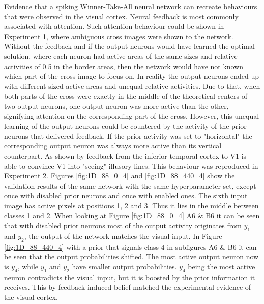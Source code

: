 Evidence that a spiking Winner-Take-All neural network can recreate behaviours that were observed in the visual cortex. Neural feedback is most commonly associated with attention. Such attention behaviour could be shown in Experiment 1, where ambiguous cross images were shown to the network. Without the feedback and if the output neurons would have learned the optimal solution, where each neuron had active areas of the same sizes and relative activities of 0.5 in the border areas, then the network would have not known which part of the cross image to focus on. In reality the output neurons ended up with different sized active areas and unequal relative activities. Due to that, when both parts of the cross were exactly in the middle of the theoretical centers of two output neurons, one output neuron was more active than the other, signifying attention on the corresponding part of the cross. However, this unequal learning of the output neurons could be countered by the activity of the prior neurons that delivered feedback. If the prior activity was set to "horizontal" the corresponding output neuron was always more active than its vertical counterpart. As shown by \citet{HierachicalBayesVisualCortex} feedback from the inferior temporal cortex to V1 is able to convince V1 into "seeing" illusory lines. This behaviour was reproduced in Experiment 2. Figures \ref{fig:1D_88_0_4} and \ref{fig:1D_88_440_4} show the validation results of the same network with the same hyperparameter set, except once with disabled prior neurons and once with enabled ones. The sixth input image has active pixels at positions 1, 2 and 3. Thus it lies in the middle between classes 1 and 2. When looking at Figure \ref{fig:1D_88_0_4} A6 & B6 it can be seen that with disabled prior neurons most of the output activity originates from $y_1$ and $y_2$, the output of the network  matches the visual input. In Figure \ref{fig:1D_88_440_4} with a prior that signals class 4 in subfigures A6 & B6 it can be seen that the output probabilities shifted. The most active output neuron now is $y_4$, while $y_1$ and $y_2$ have smaller output probabilities. $y_4$ being the most active neuron contradicts the visual input, but it is boosted by the prior information it receives. This by feedback induced belief matched the experimental evidence of the visual cortex.

